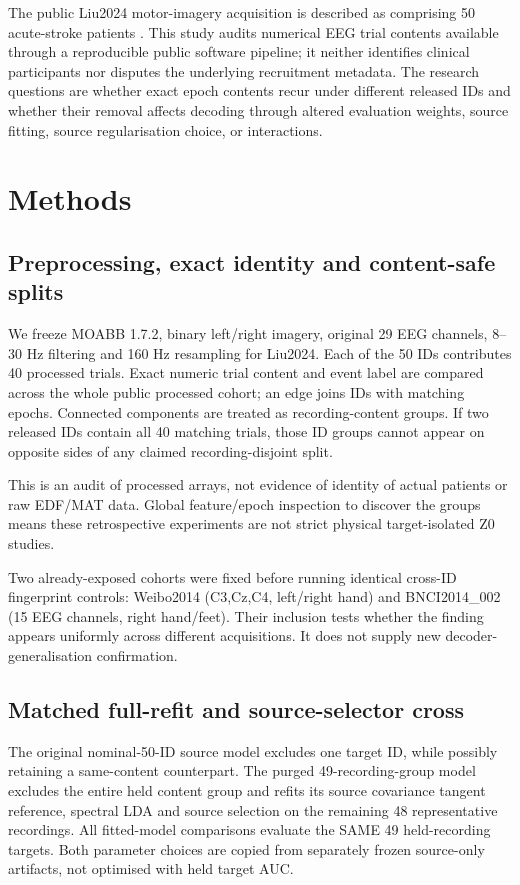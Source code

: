 \documentclass[11pt,a4paper]{article}
\begin{document}
The public Liu2024 motor-imagery acquisition is described as comprising
50 acute-stroke patients \cite{liu2024stroke}. This study audits numerical
EEG trial contents available through a reproducible public software
pipeline; it neither identifies clinical participants nor disputes the
underlying recruitment metadata. The research questions are whether
exact epoch contents recur under different released IDs and whether
their removal affects decoding through altered evaluation weights,
source fitting, source regularisation choice, or interactions.

\section{Methods}
\subsection{Preprocessing, exact identity and content-safe splits}
We freeze MOABB 1.7.2, binary left/right imagery, original 29 EEG
channels, 8--30 Hz filtering and 160 Hz resampling for Liu2024.
Each of the 50 IDs contributes 40 processed trials. Exact numeric
trial content and event label are compared across the whole
public processed cohort; an edge joins IDs with matching epochs.
Connected components are treated as recording-content groups. If two
released IDs contain all 40 matching trials, those ID groups cannot
appear on opposite sides of any claimed recording-disjoint split.

This is an audit of processed arrays, not evidence of identity
of actual patients or raw EDF/MAT data. Global feature/epoch
inspection to discover the groups means these retrospective
experiments are not strict physical target-isolated Z0 studies.

Two already-exposed cohorts were fixed before running identical
cross-ID fingerprint controls: Weibo2014 (C3,Cz,C4, left/right hand)
and BNCI2014\_002 (15 EEG channels, right hand/feet). Their inclusion
tests whether the finding appears uniformly across different acquisitions.
It does not supply new decoder-generalisation confirmation.

\subsection{Matched full-refit and source-selector cross}
The original nominal-50-ID source model excludes one target ID, while
possibly retaining a same-content counterpart. The purged
49-recording-group model excludes the entire held content group and
refits its source covariance tangent reference, spectral LDA and source
selection on the remaining 48 representative recordings.
All fitted-model comparisons evaluate the SAME 49 held-recording
targets. Both parameter choices are copied from separately frozen
source-only artifacts, not optimised with held target AUC.
\end{document}

